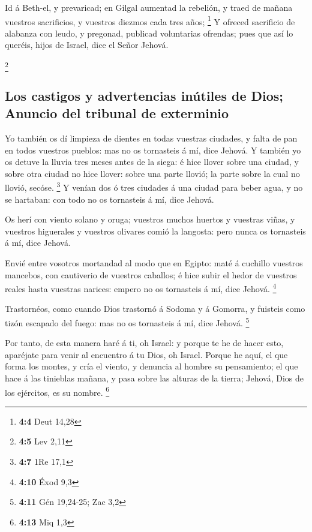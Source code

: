  Id á Beth-el, y prevaricad; en Gilgal aumentad la rebelión,
y traed de mañana vuestros sacrificios, y vuestros diezmos cada tres
años; \footnote{\textbf{4:4} Deut 14,28}  Y ofreced
sacrificio de alabanza con leudo, y pregonad, publicad voluntarias
ofrendas; pues que así lo queréis, hijos de Israel, dice el Señor
Jehová.

\footnote{\textbf{4:5} Lev 2,11}

\hypertarget{los-castigos-y-advertencias-inuxfatiles-de-dios-anuncio-del-tribunal-de-exterminio}{%
\subsection{Los castigos y advertencias inútiles de Dios; Anuncio del
tribunal de
exterminio}\label{los-castigos-y-advertencias-inuxfatiles-de-dios-anuncio-del-tribunal-de-exterminio}}

 Yo también os dí limpieza de dientes en todas vuestras
ciudades, y falta de pan en todos vuestros pueblos: mas no os tornasteis
á mí, dice Jehová.  Y también yo os detuve la lluvia tres
meses antes de la siega: é hice llover sobre una ciudad, y sobre otra
ciudad no hice llover: sobre una parte llovió; la parte sobre la cual no
llovió, secóse. \footnote{\textbf{4:7} 1Re 17,1}  Y venían
dos ó tres ciudades á una ciudad para beber agua, y no se hartaban: con
todo no os tornasteis á mí, dice Jehová.

 Os herí con viento solano y oruga; vuestros muchos huertos
y vuestras viñas, y vuestros higuerales y vuestros olivares comió la
langosta: pero nunca os tornasteis á mí, dice Jehová.

 Envié entre vosotros mortandad al modo que en Egipto: maté
á cuchillo vuestros mancebos, con cautiverio de vuestros caballos; é
hice subir el hedor de vuestros reales hasta vuestras narices: empero no
os tornasteis á mí, dice Jehová. \footnote{\textbf{4:10} Éxod 9,3}

 Trastornéos, como cuando Dios trastornó á Sodoma y á
Gomorra, y fuisteis como tizón escapado del fuego: mas no os tornasteis
á mí, dice Jehová. \footnote{\textbf{4:11} Gén 19,24-25; Zac 3,2}

 Por tanto, de esta manera haré á ti, oh Israel: y porque
te he de hacer esto, aparéjate para venir al encuentro á tu Dios, oh
Israel.  Porque he aquí, el que forma los montes, y cría el
viento, y denuncia al hombre su pensamiento; el que hace á las tinieblas
mañana, y pasa sobre las alturas de la tierra; Jehová, Dios de los
ejércitos, es su nombre. \footnote{\textbf{4:13} Miq 1,3}

